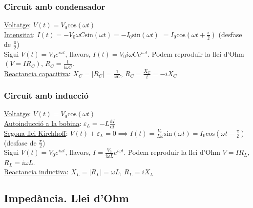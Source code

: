 \documentclass[12pt]{article}
\theoremstyle{normal}
\theoremstyle{break}
\theoremstyle{breakthm}
\begin{document}
\begin{multicols}{2}
\subsubsection*{Circuit amb condensador}
\underline{Voltatge}: $V(t) = V_0\text{cos}(\omega t)$ \\
\underline{Intensitat}: $I(t) = -V_0\omega C \text{sin}(\omega t) = -I_0\text{sin}(\omega t)$ $= I_0\text{cos}(\omega t + \frac{\pi}{2})$ (desfase de $\frac{\pi}{2}$) \\
Sigui $V(t) = V_0 e^{i\omega t}$, llavors, $I(t) = V_0i\omega Ce^{i\omega t}$. Podem reproduir la llei d'Ohm $(V=IR_C)$, $R_C = \frac{1}{i\omega C}$.\\
\underline{Reactancia capacitiva}: $X_C = \vert R_C\vert = \frac{1}{\omega C}$, $R_C = \frac{X_C}{i} = -iX_C$

\subsubsection*{Circuit amb inducció}
\underline{Voltatge}: $V(t) = V_0\text{cos}(\omega t)$ \\
\underline{Autoinducció a la bobina}: $\varepsilon_L = -L \frac{\text{d}I}{\text{d}t}$ \\
\underline{Segona llei Kirchhoff}: $V(t) + \varepsilon_L = 0 \implies I(t) = \frac{V_0}{L\omega}\text{sin}(\omega t) = I_0\text{cos}(\omega t - \frac{\pi}{2})$ (desfase de $\frac{\pi}{2}$) \\
Sigui $V(t) = V_0e^{i\omega t}$, llavors, $I = \frac{V_0}{i\omega L}e^{i\omega t}$. Podem reproduir la llei d'Ohm $V=IR_L$, $R_L=i\omega L$. \\
\underline{Reactancia inductiva}: $X_L = \vert R_L\vert = \omega L$, $R_L = iX_L$

\subsection*{Impedància. Llei d'Ohm}



\end{multicols}
\end{document}
